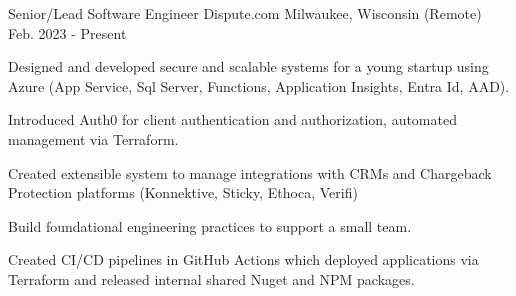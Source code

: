 

\begin{cventries}

  \cventry
    {Senior/Lead Software Engineer} %
    {Dispute.com} %
    {Milwaukee, Wisconsin (Remote)} %
    {Feb. 2023 - Present} %
    {
      \begin{cvitems} %
        \item {Designed and developed secure and scalable systems for a young startup using Azure (App Service, Sql Server, Functions, Application Insights, Entra Id, AAD).}
        \item {Introduced Auth0 for client authentication and authorization, automated management via Terraform.}
        \item {Created extensible system to manage integrations with CRMs and Chargeback Protection platforms (Konnektive, Sticky, Ethoca, Verifi)}
        \item {Build foundational engineering practices to support a small team.}
        \item {Created CI/CD pipelines in GitHub Actions which deployed applications via Terraform and released internal shared Nuget and NPM packages.}
      \end{cvitems}
    }


\end{cventries}
